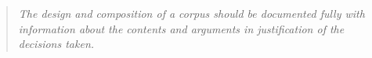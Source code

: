 \documentclass[a4paper,landscape,headrule,footrule,xetex]{foils}
\begin{document}



\begin{quotation}
  \textit{The design and composition of a corpus should be documented fully
  with information about the contents and arguments in justification
  of the decisions taken.}
\end{quotation}

\end{document}
